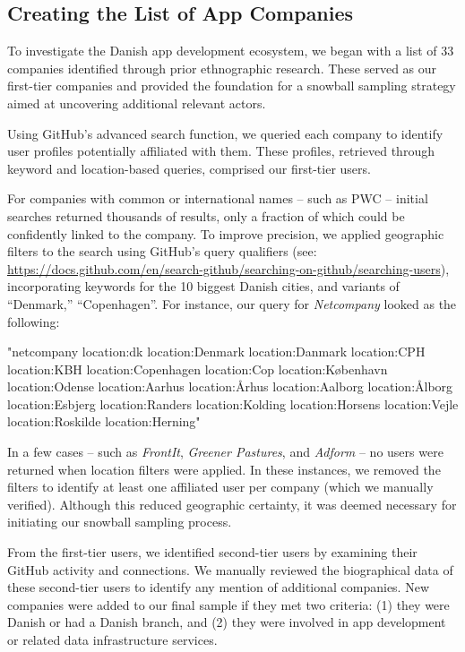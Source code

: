 \subsection{Creating the List of App Companies}

To investigate the Danish app development ecosystem, we began with a list of 33 companies identified through prior ethnographic research. These served as our first-tier companies and provided the foundation for a snowball sampling strategy aimed at uncovering additional relevant actors.

Using GitHub's advanced search function, we queried each company to identify user profiles potentially affiliated with them. These profiles, retrieved through keyword and location-based queries, comprised our first-tier users.

For companies with common or international names -- such as PWC -- initial searches returned thousands of results, only a fraction of which could be confidently linked to the company. To improve precision, we applied geographic filters to the search using GitHub's query qualifiers (see: \url{https://docs.github.com/en/search-github/searching-on-github/searching-users}), incorporating keywords for the 10 biggest Danish cities, and variants of ``Denmark,'' ``Copenhagen''. For instance, our query for \textit{Netcompany} looked as the following:

\begin{center}
\ttfamily\small
"netcompany location:dk location:Denmark location:Danmark location:CPH location:KBH location:Copenhagen location:Cop location:København location:Odense location:Aarhus location:Århus location:Aalborg location:Ålborg location:Esbjerg location:Randers location:Kolding location:Horsens location:Vejle location:Roskilde location:Herning"
\end{center}

In a few cases -- such as \textit{FrontIt}, \textit{Greener Pastures}, and \textit{Adform} -- no users were returned when location filters were applied. In these instances, we removed the filters to identify at least one affiliated user per company (which we manually verified). Although this reduced geographic certainty, it was deemed necessary for initiating our snowball sampling process.

From the first-tier users, we identified second-tier users by examining their GitHub activity and connections. We manually reviewed the biographical data of these second-tier users to identify any mention of additional companies. New companies were added to our final sample if they met two criteria: (1) they were Danish or had a Danish branch, and (2) they were involved in app development or related data infrastructure services.

